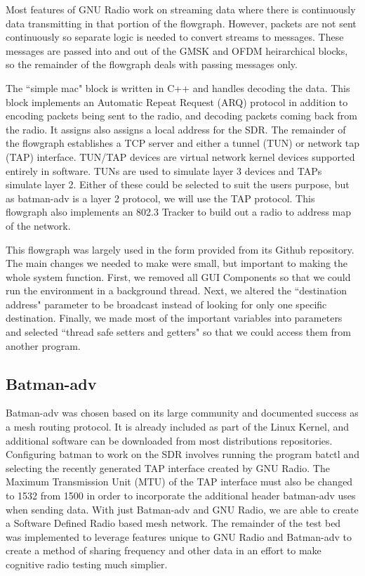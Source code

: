 Most features of GNU Radio work on streaming data where there is continuously data transmitting in that portion of the flowgraph. However, packets are not sent continuously so separate logic is needed to convert streams to messages. These messages are passed into and out of the GMSK and OFDM heirarchical blocks, so the remainder of the flowgraph deals with passing messages only. 

The ``simple mac" block is written in C++ and handles decoding the data. This block implements an Automatic Repeat Request (ARQ) protocol in addition to encoding packets being sent to the radio, and decoding packets coming back from the radio. It assigns also assigns a local address for the SDR. The remainder of the flowgraph establishes a TCP server and either a tunnel (TUN) or network tap (TAP) interface. TUN/TAP devices are virtual network kernel devices supported entirely in software. TUNs are used to simulate layer 3 devices and TAPs simulate layer 2. Either of these could be selected to suit the users purpose, but as batman-adv is a layer 2 protocol, we will use the TAP protocol. This flowgraph also implements an 802.3 Tracker to build out a radio to address map of the network. 

This flowgraph was largely used in the form provided from its Github repository. The main changes we needed to make were small, but important to making the whole system function. First, we removed all GUI Components so that we could run the environment in a background thread. Next, we altered the ``destination address" parameter to be broadcast instead of looking for only one specific destination. Finally, we made most of the important variables into parameters and selected ``thread safe setters and getters" so that we could access them from another program. 

\subsection{Batman-adv}

Batman-adv was chosen based on its large community and documented success as a mesh routing protocol. It is already included as part of the Linux Kernel, and additional software can be downloaded from most distributions repositories. Configuring batman to work on the SDR involves running the program batctl and selecting the recently generated TAP interface created by GNU Radio. The Maximum Transmission Unit (MTU) of the TAP interface must also be changed to 1532 from 1500 in order to incorporate the additional header batman-adv uses when sending data. With just Batman-adv and GNU Radio, we are able to create a Software Defined Radio based mesh network. The remainder of the test bed was implemented to leverage features unique to GNU Radio and Batman-adv to create a method of sharing frequency and other data in an effort to make cognitive radio testing much simplier. 

